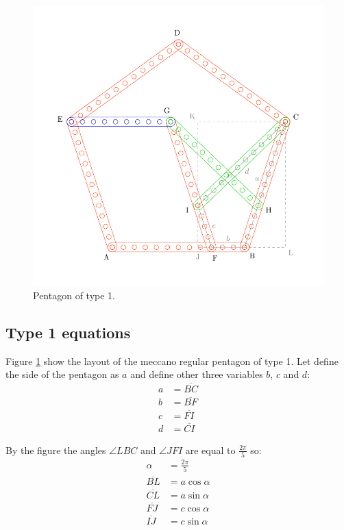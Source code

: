 \documentclass[11pt]{article}
\begin{document}
\begin{figure}[htpb]
\centering
\includegraphics[scale=1]{types/1}
\caption{Pentagon of type 1.}
\label{fig:type-1}
\end{figure}

\subsection{Type 1 equations}

Figure \ref{fig:type-1} show the layout of the meccano regular pentagon of type 1.
Let define the side of the pentagon as $a$ and define other three variables $b$, $c$ and $d$:
\begin{align*}
a &= \overline{BC}\\
b &= \overline{BF}\\
c &= \overline{FI}\\
d &= \overline{CI}
\end{align*}

By the figure the angles $\angle{LBC}$ and $\angle{JFI}$ are equal to $\frac{2\pi}{5}$ so:
\begin{align*}
\alpha &= \frac{2\pi}{5}\\
\overline{BL} &= a\cos{\alpha}\\
\overline{CL} &= a\sin{\alpha}\\
\overline{FJ} &= c\cos{\alpha}\\
\overline{IJ} &= c\sin{\alpha}
\end{align*}
\end{document}
